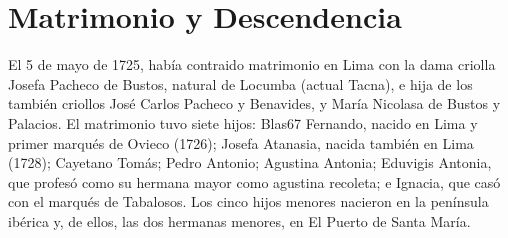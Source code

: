 \section{Matrimonio y Descendencia}

El 5 de mayo de 1725, había contraido matrimonio en Lima con la dama
criolla Josefa Pacheco de Bustos, natural de Locumba (actual Tacna), e
hija de los también criollos José Carlos Pacheco y Benavides, y María
Nicolasa de Bustos y Palacios. El matrimonio tuvo siete hijos: Blas67
Fernando, nacido en Lima y primer marqués de Ovieco (1726); Josefa
Atanasia, nacida también en Lima (1728); Cayetano Tomás; Pedro
Antonio; Agustina Antonia; Eduvigis Antonia, que profesó como su
hermana mayor como agustina recoleta; e Ignacia, que casó con el
marqués de Tabalosos. Los cinco hijos menores nacieron en la península
ibérica y, de ellos, las dos hermanas menores, en El Puerto de Santa
María.
